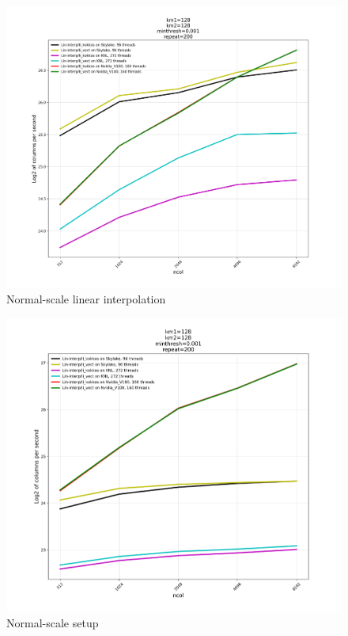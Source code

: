 \documentclass[10pt,twocolumn]{article}
\begin{document}
\begin{figure}[hbt]
  \centering
  \includegraphics[width=1.0\linewidth]{final-li.pdf}
  \caption{Normal-scale linear interpolation}
\end{figure}

\begin{figure}[hbt]
  \centering
  \includegraphics[width=1.0\linewidth]{final-setup.pdf}
  \caption{Normal-scale setup}
\end{figure}
\end{document}
